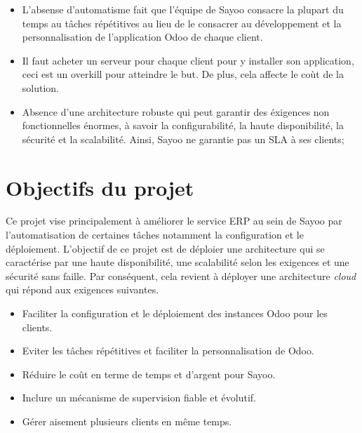 \begin{onehalfspace}
\begin{itemize}
\item L'absense d'automatisme fait que l'équipe de Sayoo consacre la plupart du temps au tâches répétitives au lieu de le consacrer au développement et la personnalisation de l'application Odoo de chaque client. 

\item Il faut acheter un serveur pour chaque client pour y installer son application, ceci est un overkill pour atteindre le but. De plus, cela affecte le coùt de la solution.

\item Absence d'une architecture robuste qui peut garantir des éxigences non fonctionnelles énormes, à savoir la configurabilité, la haute disponibilité, la sécurité et la scalabilité. Ainsi, Sayoo ne garantie pas un SLA à ses clients;

\end{itemize}




\section{Objectifs du projet}
Ce projet vise principalement à améliorer le service ERP au sein de Sayoo par l'automatisation de certaines tâches notamment la configuration et le déploiement. L'objectif de ce projet est de déploier une architecture qui se caractérise par une haute disponibilité, une scalabilité selon les exigences et une sécurité sans faille. Par conséquent, cela revient à déployer une architecture \emph{cloud} qui répond aux exigences suivantes.
\begin{itemize}

\item Faciliter la configuration et le déploiement des instances Odoo pour les clients.

\item Eviter les tâches répétitives et faciliter la personnalisation de Odoo.

\item Réduire le coût en terme de temps et d'argent pour Sayoo.

\item Inclure un mécanisme de supervision fiable et évolutif.

\item Gérer aisement plusieurs clients en même temps.  
 
 \end{itemize}







\end{onehalfspace}
